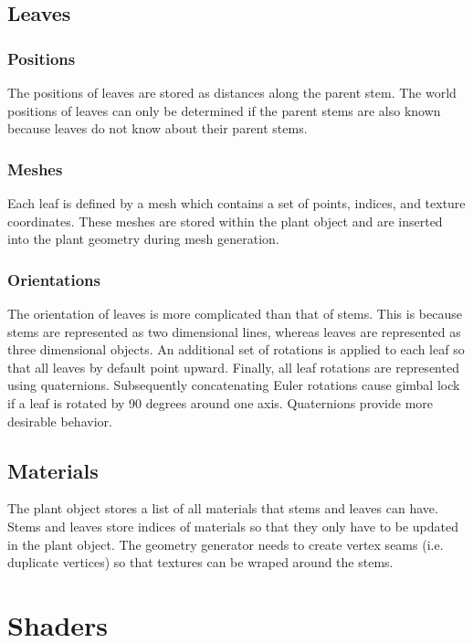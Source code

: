 \documentclass[10pt]{article}
\begin{document}
\subsection{Leaves}

\subsubsection{Positions}

The positions of leaves are stored as distances along the parent stem. The world positions of leaves can only be determined if the parent stems are also known because leaves do not know about their parent stems.

\subsubsection{Meshes}

Each leaf is defined by a mesh which contains a set of points, indices, and texture coordinates. These meshes are stored within the plant object and are inserted into the plant geometry during mesh generation.

\subsubsection{Orientations}

The orientation of leaves is more complicated than that of stems. This is because stems are represented as two dimensional lines, whereas leaves are represented as three dimensional objects. An additional set of rotations is applied to each leaf so that all leaves by default point upward. Finally, all leaf rotations are represented using quaternions. Subsequently concatenating Euler rotations cause gimbal lock if a leaf is rotated by 90 degrees around one axis. Quaternions provide more desirable behavior.

\subsection{Materials}

The plant object stores a list of all materials that stems and leaves can have. Stems and leaves store indices of materials so that they only have to be updated in the plant object. The geometry generator needs to create vertex seams (i.e. duplicate vertices) so that textures can be wraped around the stems.

\pagebreak
\section{Shaders}
\end{document}
